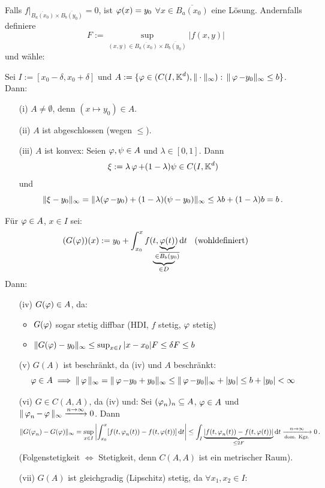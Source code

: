 \documentclass[a4paper]{article}
\begin{document}
\begin{Beweis}
Falls $f|_{\overline{B_a(x_0)}\times \overline{B_b(y_0)}}=0$, ist $\operatorname{\varphi}(x)=y_0$ $\forall x\in \overline{B_a(x_0)}$ eine Lösung. Andernfalls definiere 
\[F:=\sup_{(x,y)\in \overline{B_a(x_0)}\times \overline{B_b(y_0)}} |f(x,y)|\]
 und wähle:
 \begin{center}
\end{center}
Sei $I:=[x_0-\delta,x_0+\delta]$ und $A:=\{\operatorname{\varphi}\in (C(I,\operatorname{\mathbb K}^d),\|\cdot\|_{\infty}):\, \|\operatorname{\varphi}-y_0\|_{\infty}\le b\}$. Dann:
\begin{itemize}
\item[(i)] $A\ne \emptyset$, denn $(x\mapsto y_0)\in A$.
\item[(ii)] $A$ ist abgeschlossen (wegen \glqq$\le$\grqq{}).
\item[(iii)] $A$ ist konvex: Seien $\operatorname{\varphi},\psi\in A$ und $\lambda\in[0,1]$. Dann
\[\xi:=\lambda \operatorname{\varphi}+(1-\lambda)\psi\in C(I,\operatorname{\mathbb K}^d)\]
und
\[\|\xi-y_0\|_{\infty}=\|\lambda(\operatorname{\varphi}-y_0)+(1-\lambda)(\psi-y_0)\|_{\infty}\le \lambda b+(1-\lambda)b=b\,.\]
\end{itemize}
Für $\operatorname{\varphi}\in A$, $x\in I$ sei: 
\[(G(\vp))(x):=y_0+\int_{x_0}^xf(\underbrace{t,\underbrace{\vp(t)}_{\mathclap{\in \overline{B_b(y_0)}}}}_{\in D})\dd t\;\;\te{(wohldefiniert)}\]
Dann:
\begin{itemize}
\item[(iv)] $G(\operatorname{\varphi})\in A$, da:
\begin{itemize}
\item $G(\operatorname{\varphi})$ sogar stetig diffbar (HDI, $f$ stetig, $\operatorname{\varphi}$ stetig)
\item $\|G(\operatorname{\varphi})-y_0\|_{\infty}\le \sup_{x\in I}|x-x_0|F\le \delta F\le b$
\end{itemize}
\item[(v)] $G(A)$ ist beschränkt, da (iv) und $A$ beschränkt:
\[\operatorname{\varphi}\in A\implies \|\operatorname{\varphi}\|_{\infty}=\|\operatorname{\varphi}-y_0+y_0\|_{\infty}\le\|\operatorname{\varphi}-y_0\|_{\infty}+|y_0|\le b+|y_0|<\infty\]
\item[(vi)] $G\in C(A,A)$, da (iv) und: Sei $(\operatorname{\varphi}_n)_n\subseteq A$, $\operatorname{\varphi}\in A$ und $\|\operatorname{\varphi}_n-\operatorname{\varphi}\|_{\infty}\xrightarrow{n\to\infty}0$. Dann
\[\|G(\operatorname{\varphi}_n)-G(\operatorname{\varphi})\|_{\infty}=\sup_{x\in I}\left|\int_{x_0}^x[f(t,\operatorname{\varphi}_n(t))-f(t,\operatorname{\varphi}(t))]\mathop{}\!\mathrm{d} t\right|\le \int_I\underbrace{|f(t,\operatorname{\varphi}_n(t))-f(t,\operatorname{\varphi}(t))|}_{\le 2F}\mathop{}\!\mathrm{d} t\xrightarrow[\text{dom. Kgz.}]{n\to\infty}0\,.\]
(Folgenstetigkeit $\iff$ Stetigkeit, denn $C(A,A)$ ist ein metrischer Raum).
\item[(vii)] $G(A)$ ist gleichgradig (Lipschitz) stetig, da $\forall x_1,x_2\in I$:

\end{itemize}
\end{Beweis}
\end{document}
